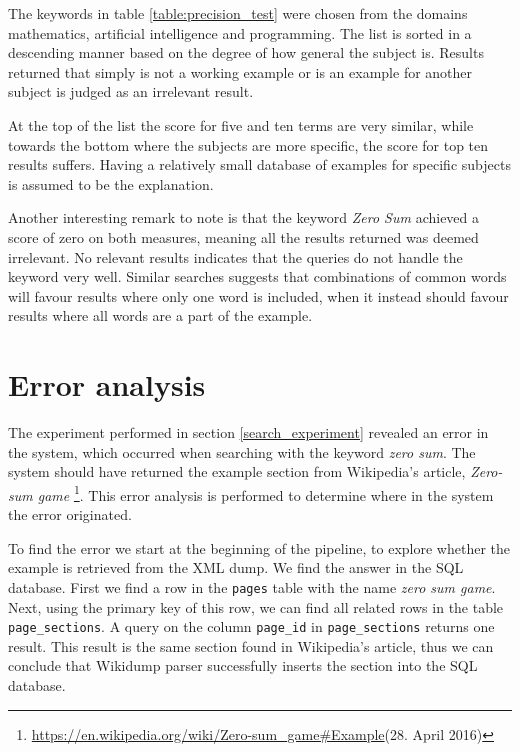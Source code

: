 The keywords in table \ref{table:precision_test} were chosen from the domains mathematics, artificial intelligence and programming. The list is sorted in a descending manner based on the degree of how general the subject is.
Results returned that simply is not a working example or is an example for another subject is judged as an irrelevant result.

At the top of the list the score for five and ten terms are very similar, while towards the bottom where the subjects are more specific, the score for top ten results suffers. Having a relatively small database of examples for specific subjects is assumed to be the explanation.

Another interesting remark to note is that the keyword \textit{Zero Sum} achieved a score of zero on both measures, meaning all the results returned was deemed irrelevant. No relevant results indicates that the queries do not handle the keyword very well. Similar searches suggests that combinations of common words will favour results where only one word is included, when it instead should favour results where all words are a part of the example.

\section{Error analysis}

The experiment performed in section \ref{search_experiment} revealed an error in the system, which occurred when searching with the keyword \textit{zero sum}. The system should have returned the example section from Wikipedia's article, \textit{Zero-sum game} \footnote{\url{https://en.wikipedia.org/wiki/Zero-sum\_game\#Example}(28. April 2016)}. This error analysis is performed to determine where in the system the error originated. 

To find the error we start at the beginning of the pipeline, to explore whether the example is retrieved from the XML dump. We find the answer in the SQL database. First we find a row in the \texttt{pages} table with the name \textit{zero sum game}. Next, using the primary key of this row, we can find all related rows in the table \texttt{page\_sections}. A query on the column \texttt{page\_id} in \texttt{page\_sections} returns one result. This result is the same section found in Wikipedia's article, thus we can conclude that Wikidump parser successfully inserts the section into the SQL database.

